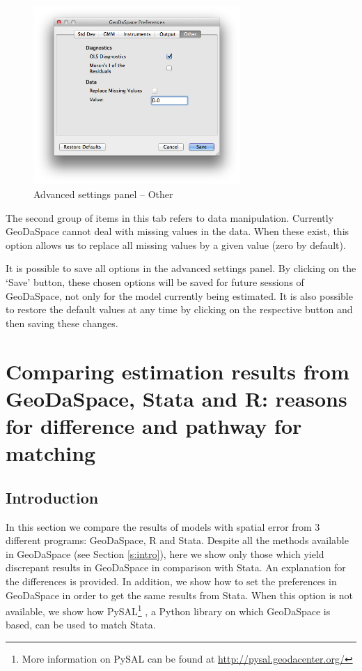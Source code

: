 \documentclass{article}
\begin{document}
\begin{figure}[htb]
\centering
\caption{Advanced settings panel -- Other}
\label{f:adv_other}
\includegraphics[width=0.7\textwidth]{adv_other.png}
\end{figure}

The second group of items in this tab refers to data manipulation. Currently GeoDaSpace cannot deal with missing values in the data. When these exist, this option allows us to replace all missing values by a given value (zero by default).

It is possible to save all options in the advanced settings panel. By clicking on the `Save’ button, these chosen options will be saved for future sessions of GeoDaSpace, not only for the model currently being estimated. It is also possible to restore the default values at any time by clicking on the respective button and then saving these changes.

\newpage

\section{Comparing estimation results from GeoDaSpace, Stata and R: reasons for difference and pathway for matching}
\label{s:comparisons}

\subsection{Introduction}
In this section we compare the results of models with spatial error from 3 different programs: GeoDaSpace, R and Stata. Despite all the methods available in GeoDaSpace (see Section \ref{s:intro}), here we show only those which yield discrepant results in GeoDaSpace in comparison with Stata. An explanation for the differences is provided. In addition, we show how to set the preferences in GeoDaSpace in order to get the same results from Stata. When this option is not available, we show how PySAL\footnote{More information on PySAL can be found at \url{http://pysal.geodacenter.org/}} \citep{Rey07}, a Python library on which GeoDaSpace is based, can be used to match Stata.
\end{document}
